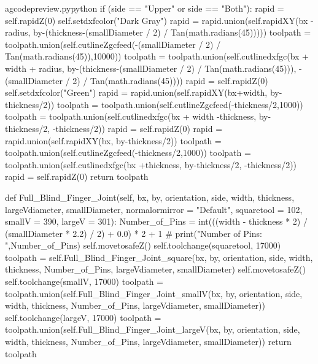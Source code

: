 \documentclass{ltxdoc}
\begin{document}
\begin{writecode}{a}{gcodepreview.py}{python}
            if (side == "Upper" or side == "Both"):
                rapid = self.rapidZ(0)
                self.setdxfcolor("Dark Gray")
                rapid = rapid.union(self.rapidXY(bx - radius, by-(thickness-(smallDiameter / 2) / Tan(math.radians(45)))))
                toolpath = toolpath.union(self.cutlineZgcfeed(-(smallDiameter / 2) / Tan(math.radians(45)),10000))
                toolpath = toolpath.union(self.cutlinedxfgc(bx + width + radius, by-(thickness-(smallDiameter / 2) / Tan(math.radians(45))), -(smallDiameter / 2) / Tan(math.radians(45))))
                rapid = self.rapidZ(0)
                self.setdxfcolor("Green")
                rapid = rapid.union(self.rapidXY(bx+width, by-thickness/2))
                toolpath = toolpath.union(self.cutlineZgcfeed(-thickness/2,1000))
                toolpath = toolpath.union(self.cutlinedxfgc(bx + width -thickness, by-thickness/2, -thickness/2))
                rapid = self.rapidZ(0)
                rapid = rapid.union(self.rapidXY(bx, by-thickness/2))
                toolpath = toolpath.union(self.cutlineZgcfeed(-thickness/2,1000))
                toolpath = toolpath.union(self.cutlinedxfgc(bx +thickness, by-thickness/2, -thickness/2))
        rapid = self.rapidZ(0)
        return toolpath

    def Full_Blind_Finger_Joint(self, bx, by, orientation, side, width, thickness, largeVdiameter, smallDiameter, normalormirror = "Default", squaretool = 102, smallV = 390, largeV = 301):
        Number_of_Pins = int(((width - thickness * 2) / (smallDiameter * 2.2) / 2) + 0.0) * 2 + 1
#        print("Number of Pins: ",Number_of_Pins)
        self.movetosafeZ()
        self.toolchange(squaretool, 17000)
        toolpath = self.Full_Blind_Finger_Joint_square(bx, by, orientation, side, width, thickness, Number_of_Pins, largeVdiameter, smallDiameter)
        self.movetosafeZ()
        self.toolchange(smallV, 17000)
        toolpath = toolpath.union(self.Full_Blind_Finger_Joint_smallV(bx, by, orientation, side, width, thickness, Number_of_Pins, largeVdiameter, smallDiameter))
        self.toolchange(largeV, 17000)
        toolpath = toolpath.union(self.Full_Blind_Finger_Joint_largeV(bx, by, orientation, side, width, thickness, Number_of_Pins, largeVdiameter, smallDiameter))
        return toolpath

\end{writecode}
\addtocounter{gcpy}{179}
\end{document}
